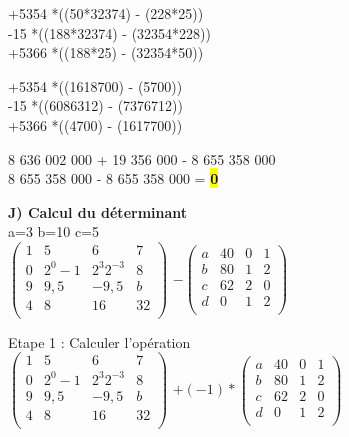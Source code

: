 +5354 *((50*32374) - (228*25)) \\

-15 *((188*32374) - (32354*228)) \\

+5366 *((188*25) - (32354*50)) \\

\vspace{5mm} %

+5354 *((1618700) - (5700)) \\

-15 *((6086312) - (7376712)) \\

+5366 *((4700) - (1617700)) \\

\vspace{5mm} %

8 636 002 000 + 19 356 000 - 8 655 358 000 \\

8 655 358 000 - 8 655 358 000 = \hl{\textbf{0}}

\newpage

\textbf{J) Calcul du déterminant} \\

a=3 b=10 c=5 \\

$
\begin{pmatrix}
  1 & 5 & 6 & 7 \\
  0 & 2^{0}-1 & 2^{3}2^{-3} & 8 \\
  9 & 9,5 & -9,5 & b \\
  4 & 8 & 16 & 32 \\
\end{pmatrix}
$
\vspace{5mm} %
$
-
\begin{pmatrix}
  a & 40 & 0 & 1 \\
  b & 80 & 1 & 2 \\
  c & 62 & 2 & 0 \\
  d & 0  & 1 & 2 \\
\end{pmatrix}
$

Etape 1 :  Calculer l'opération \\

\vspace{3mm} %
$
\begin{pmatrix}
  1 & 5 & 6 & 7 \\
  0 & 2^{0}-1 & 2^{3}2^{-3} & 8 \\
  9 & 9,5 & -9,5 & b \\
  4 & 8 & 16 & 32 \\
\end{pmatrix}
$
\vspace{5mm} %
$
+(-1)*
\begin{pmatrix}
  a & 40 & 0 & 1 \\
  b & 80 & 1 & 2 \\
  c & 62 & 2 & 0 \\
  d & 0  & 1 & 2 \\
\end{pmatrix}
$

